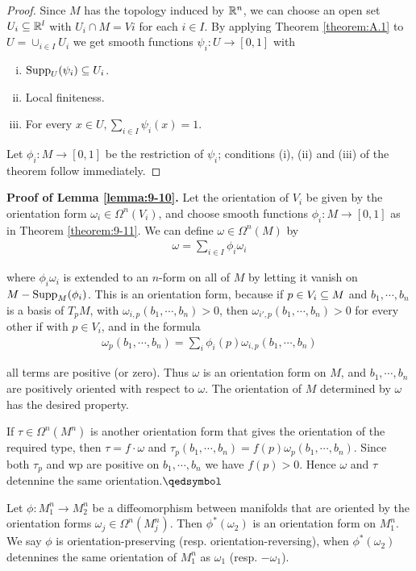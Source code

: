 \begin{proof}
  Since $M$ has the topology induced by $\mathbb{R}^n$, we can choose an open set
$U_i\subseteq \mathbb{R}^l$ with $U_i\cap M = Vi$ for each $i\in I$. By applying Theorem \ref{theorem:A.1} 
to $U= \cup_{i\in I} U_i$ we get smooth functions $\psi_i:U\to [0, 1]$ with
\begin{enumerate}[(i)]
  \item $\mathrm{Supp}_U(\psi_i)\subseteq U_i$.
  \item Local finiteness.
  \item For every $x\in U, \sum_{i\in I}\psi_i(x) = 1$.
\end{enumerate}
Let $\phi_i:M\to [0, 1]$ be the restriction of $\psi_i$; conditions (i), (ii) and (iii) of the
theorem follow immediately.
\end{proof}

\textbf{Proof of Lemma \ref{lemma:9-10}.} Let the orientation of $V_i$ be given by the orientation 
form $\omega_i\in\Omega^n(V_i)$, and choose smooth functions $\phi_i:M\to [0, 1]$ as in Theorem \ref{theorem:9-11}.
We can define $\omega\in\Omega^n(M)$ by
\begin{align*}
  \omega = \sum_{i\in I}^{}{\phi_i\omega_i}
\end{align*}

where $\phi_i\omega_i$ is extended to an $n$-form on all of $M$ by letting it vanish on
$M-\mathrm{Supp}_M(\phi_i)$. This is an orientation form, because if $p\in V_i\subseteq M$ and
$b_1, \cdots, b_n$ is a basis of $T_pM$, with $\omega_{i,p}(b_1, \cdots ,b_n) > 0$, then 
$\omega_{i',p}(b_1, \cdots ,b_n)>0$ for every other if with $p\in V_i$, and in the formula
\begin{align*}
  \omega_p(b_1, \cdots ,b_n)
  = \sum_{i}^{}{\phi_i(p)\omega_{i,p}(b_1, \cdots ,b_n)}
\end{align*}

all terms are positive (or zero). Thus $\omega$ is an orientation form on $M$, and $b_1, \cdots, b_n$
are positively oriented with respect to $\omega$. The orientation of $M$ determined by
$\omega$ has the desired property.

If $\tau\in\Omega^n(M^n)$ is another orientation form that gives the orientation of the required
type, then $\tau=f\cdot \omega$ and $\tau_p(b_1, \cdots, b_n) = f(p)\omega_p(b_1, \cdots , b_n)$. 
Since both $\tau_p$ and wp are positive on $b_1, \cdots, b_n$ we have $f(p) > 0$. Hence $\omega$ 
and $\tau$ detennine the same orientation.\hfill\(\qedsymbol\)

\begin{definition}\label{def:9-12}
  Let $\phi:M_1^n\to M_2^n$ be a diffeomorphism between manifolds that
  are oriented by the orientation forms $\omega_j\in\Omega^n(M_j^n)$. Then $\phi^*(\omega_2)$ 
  is an orientation form on $M_1^n$. We say $\phi$ is orientation-preserving (resp. orientation-reversing),
  when $\phi^*(\omega_2)$ detennines the same orientation of $M_1^n$ as $\omega_1$ (resp. $-\omega_1$).
\end{definition}

